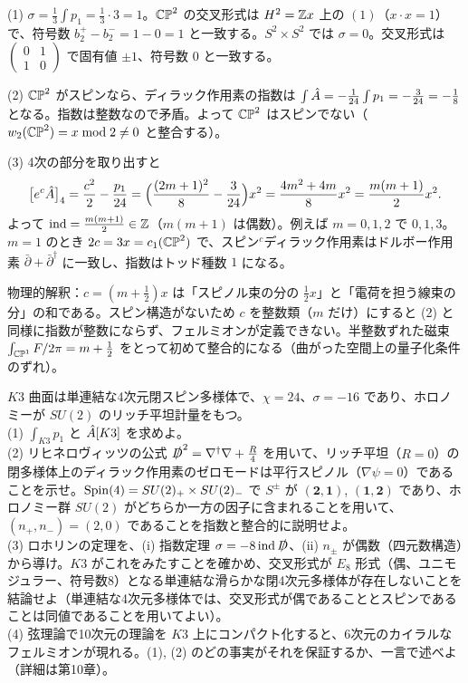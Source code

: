 \begin{solution}
(1) $\sigma=\frac13\int p_1=\frac13\cdot3=1$。$\mathbb{CP}^2$ の交叉形式は $H^2=\mathbb{Z} x$ 上の $(1)$（$x\cdot x=1$）で、符号数 $b_2^+-b_2^-=1-0=1$ と一致する。$S^2\times S^2$ では $\sigma=0$。交叉形式は $\begin{pmatrix}0&1\\1&0\end{pmatrix}$ で固有値 $\pm1$、符号数 $0$ と一致する。

(2) $\mathbb{CP}^2$ がスピンなら、ディラック作用素の指数は $\int\hat{A}=-\frac1{24}\int p_1=-\frac{3}{24}=-\frac18$ となる。指数は整数なので矛盾。よって $\mathbb{CP}^2$ はスピンでない（$w_2(\mathbb{CP}^2)=x\bmod2\ne0$ と整合する）。

(3) 4次の部分を取り出すと
\[
\bigl[e^c\hat{A}\bigr]_4=\frac{c^2}{2}-\frac{p_1}{24}=\Bigl(\frac{(2m+1)^2}{8}-\frac{3}{24}\Bigr)x^2=\frac{4m^2+4m}{8}x^2=\frac{m(m+1)}{2}x^2 .
\]
よって $\operatorname{ind}=\frac{m(m+1)}2\in\mathbb{Z}$（$m(m+1)$ は偶数）。例えば $m=0,1,2$ で $0,1,3$。$m=1$ のとき $2c=3x=c_1(\mathbb{CP}^2)$ で、スピン$^c$ディラック作用素はドルボー作用素 $\bar\partial+\bar\partial^\dagger$ に一致し、指数はトッド種数 $1$ になる。

物理的解釈：$c=(m+\frac12)x$ は「スピノル束の分の $\frac12x$」と「電荷を担う線束の分」の和である。スピン構造がないため $c$ を整数類（$m$ だけ）にすると (2) と同様に指数が整数にならず、フェルミオンが定義できない。半整数ずれた磁束 $\int_{\mathbb{CP}^1}F/2\pi=m+\frac12$ をとって初めて整合的になる（曲がった空間上の量子化条件のずれ）。
\end{solution}

\begin{problem}[難易度 B]\label{ch09-prob-k3}
$K3$ 曲面は単連結な4次元閉スピン多様体で、$\chi=24$、$\sigma=-16$ であり、ホロノミーが $SU(2)$ のリッチ平坦計量をもつ。\\
(1) $\int_{K3}p_1$ と $\hat{A}[K3]$ を求めよ。\\
(2) リヒネロヴィッツの公式 $\slashed D^2=\nabla^\dagger\nabla+\frac R4$ を用いて、リッチ平坦（$R=0$）の閉多様体上のディラック作用素のゼロモードは平行スピノル（$\nabla\psi=0$）であることを示せ。$\operatorname{Spin}(4)=SU(2)_+\times SU(2)_-$ で $S^\pm$ が $(\mathbf 2,\mathbf 1)$, $(\mathbf 1,\mathbf 2)$ であり、ホロノミー群 $SU(2)$ がどちらか一方の因子に含まれることを用いて、$(n_+,n_-)=(2,0)$ であることを指数と整合的に説明せよ。\\
(3) ロホリンの定理を、(i) 指数定理 $\sigma=-8\operatorname{ind}\slashed D$、(ii) $n_\pm$ が偶数（四元数構造）から導け。$K3$ がこれをみたすことを確かめ、交叉形式が $E_8$ 形式（偶、ユニモジュラー、符号数8）となる単連結な滑らかな閉4次元多様体が存在しないことを結論せよ（単連結な4次元多様体では、交叉形式が偶であることとスピンであることは同値であることを用いてよい）。\\
(4) 弦理論で10次元の理論を $K3$ 上にコンパクト化すると、6次元のカイラルなフェルミオンが現れる。(1), (2) のどの事実がそれを保証するか、一言で述べよ（詳細は第10章）。
\end{problem}

